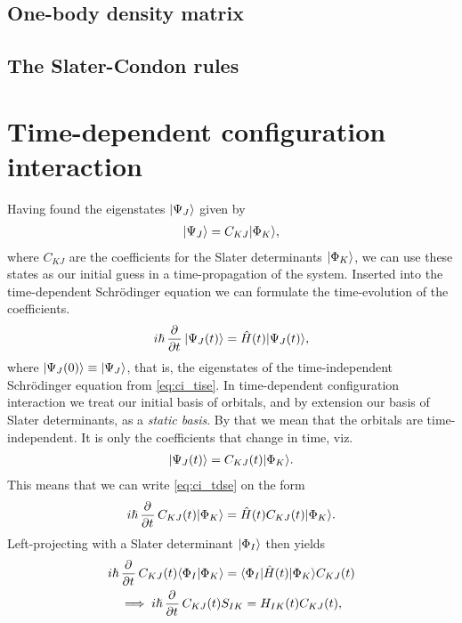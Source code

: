         \subsection{One-body density matrix}

        \subsection{The Slater-Condon rules}

    \section{Time-dependent configuration interaction}
        Having found the eigenstates $| \Psi_J \rangle$ given by
        \begin{align}
            | \Psi_J \rangle = C_{KJ}| \Phi_K \rangle,
        \end{align}
        where $C_{KJ}$ are the coefficients for the Slater determinants
        $| \Phi_K \rangle$,
        we can use these states as our initial guess in a time-propagation of
        the system.
        Inserted into the time-dependent Schrödinger equation we can formulate
        the time-evolution of the coefficients.
        \begin{align}
            i\hslash \dpd[]{}{t}\ket{\Psi_J(t)}
            = \hamil(t)\ket{\Psi_J(t)},
            \label{eq:ci_tdse}
        \end{align}
        where $| \Psi_J(0) \rangle \equiv | \Psi_J \rangle$, that is, the eigenstates of
        the time-independent Schrödinger equation from \autoref{eq:ci_tise}.
        In time-dependent configuration interaction we treat our initial basis
        of orbitals, and by extension our basis of Slater determinants, as a
        \emph{static basis}.
        By that we mean that the orbitals are time-independent.
        It is only the coefficients that change in time, viz.
        \begin{align}
            | \Psi_J(t) \rangle = C_{KJ}(t)| \Phi_K \rangle.
        \end{align}
        This means that we can write \autoref{eq:ci_tdse} on the form
        \begin{align}
            i\hslash \dpd[]{}{t}C_{KJ}(t)\ket{\Phi_K}
            = \hamil(t) C_{KJ}(t)\ket{\Phi_K}.
        \end{align}
        Left-projecting with a Slater determinant $| \Phi_I \rangle$ then yields
        \begin{gather}
            i\hslash \dpd[]{}{t}C_{KJ}(t)\braket{\Phi_I}{\Phi_K}
            = \bra{\Phi_I}\hamil(t)\ket{\Phi_K} C_{KJ}(t) \\
            \implies
            i\hslash \dpd[]{}{t}C_{KJ}(t) S_{IK}
            = H_{IK}(t) C_{KJ}(t),
        \end{gather}
